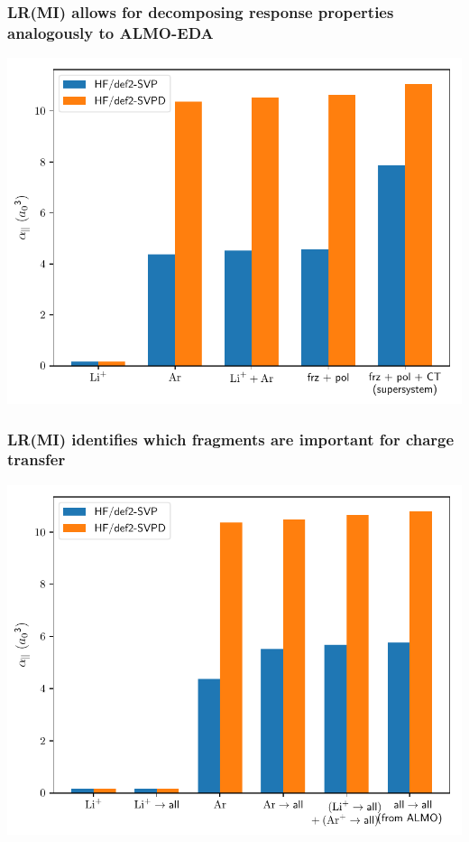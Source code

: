 \documentclass[%
    xcolor=usenames,dvipsnames,svgnames%
]{beamer}
\newenvironment{nscenter}
 {\parskip=0pt\par\nopagebreak\centering}
 {\par\noindent\ignorespacesafterend}
\begin{document}
\begin{frame}
  \frametitle{LR(MI) allows for decomposing response properties analogously to ALMO-EDA}
  \begin{nscenter}
    \includegraphics[scale=0.70]{./figures/bar_combined.pdf}
  \end{nscenter}
\end{frame}

\begin{frame}
  \frametitle{LR(MI) identifies which fragments are important for charge transfer}
  \begin{nscenter}
    \includegraphics[scale=0.70]{./figures/bar_virtual_combined.pdf}
  \end{nscenter}
\end{frame}
\end{document}
